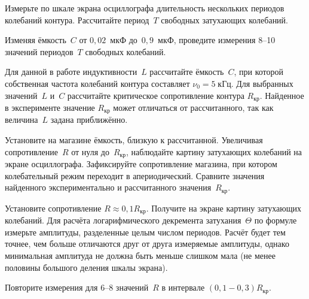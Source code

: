 \begin{lab:task}
\item Измерьте по шкале экрана осциллографа длительность нескольких периодов
колебаний контура. Рассчитайте период~$T$ свободных затухающих 
колебаний.

\item \label{325-p2} Изменяя ёмкость~$C$ от $0,02$~мкФ до~$0,9$~мкФ, проведите измерения 
8--10 значений периодов~$T$ свободных колебаний.



\item \label{325-p8} Для данной в работе индуктивности~$L$ рассчитайте 
ёмкость~$C$, при которой собственная частота колебаний контура составляет $\nu_0=5\;кГц$.
Для выбранных значений~$L$ и~$C$ рассчитайте критическое сопротивление
контура $R_\text{кр}$. Найденное в эксперименте значение $R_{\text{кр}}$
может отличаться от рассчитанного, так как величина~$L$ задана приближённо.


\item Установите на магазине ёмкость, близкую к рассчитанной. Увеличивая
сопротивление~$R$ от нуля до~$R_\text{кр}$, наблюдайте картину затухающих
колебаний на экране осциллографа. Зафиксируйте сопротивление магазина, при
котором колебательный режим переходит в апериодический. Сравните значения
найденного экспериментально и рассчитанного значения~$R_\text{кр}$.

\item Установите сопротивление $R \approx 0,1 R_\text{кр}$. Получите
на экране картину затухающих колебаний. Для расчёта логарифмического декремента
затухания~$\Theta$ по формуле~ измерьте амплитуды,
разделенные целым числом периодов. Расчёт будет тем точнее, чем больше
отличаются друг от друга измеряемые амплитуды, однако минимальная амплитуда не должна быть
меньше слишком мала (не менее половины большого деления шкалы экрана).

\item \label{325-p9} Повторите измерения для 6--8 значений~$R$ 
в интервале $(0,1-0,3)R_\text{кр}$.



\end{lab:task}
